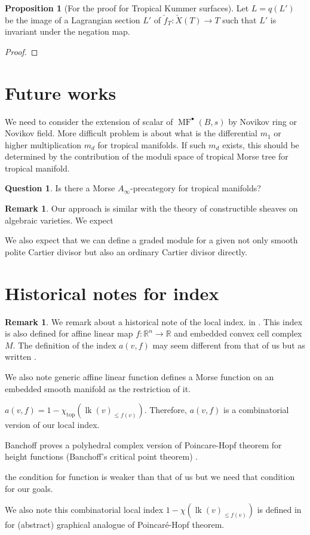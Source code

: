 \documentclass[a4paper,dvipdfmx,reqno,12pt]{amsart}
\theoremstyle{definition}
\newtheorem{Prop}[Thm]{Proposition}
\newtheorem{Ques}[Thm]{Question}
\newtheorem{Rmk}[Thm]{Remark}
\newcommand{\R}{\mathbb{R}}%
\newcommand{\opn}[1]{\operatorname{#1}}
\numberwithin{equation}{section}
\begin{document}
\begin{Prop}[{For the proof for Tropical Kummer surfaces}]
Let $L=q(L')$ be the image of a Lagrangian 
section $L'$ of $\check{f}_{T}\colon \check{X}(T)\to T$ such 
that $L'$ is invariant under the negation map. 
\end{Prop}
\begin{proof}

\end{proof}


\section{Future works}
We need to consider the extension of scalar of 
$\opn{MF}^{\bullet}(B,s)$ by 
Novikov ring or Novikov field.
More difficult problem is about what is the differential $m_1$ or higher multiplication $m_d$ for tropical manifolds.
If such $m_d$ exists, this should be determined by the contribution of the moduli space of tropical Morse tree for tropical manifold.
\begin{Ques}
  Is there a Morse $A_{\infty}$-precategory for tropical manifolds?
\end{Ques}

\begin{Rmk}
Our approach is similar with the theory of constructible sheaves 
on algebraic varieties.
We expect
\end{Rmk}

We also expect that we can define a graded module for a given
not only smooth polite Cartier divisor but also 
an ordinary Cartier divisor directly.



\appendix

\section{Historical notes for index}

\begin{Rmk}
  We remark about a historical note of the local index.
  in \cite[p.246]{MR225327}.
  This index is also defined for affine linear map $f:\R^{n}\to \R$ and embedded convex cell complex
  $M$.
  The definition of the index $a(v,f)$
  may seem different from that of us but as written .

  We also note generic affine linear function defines a Morse function
  on an embedded smooth manifold as the restriction of it.

  $a(v,f)=1-\chi_{\mathrm{top}}(\opn{lk}(v)_{\leq f(v)})$. Therefore, $a(v,f)$ is a combinatorial version of our local index.

  Banchoff proves a polyhedral complex version of Poincare-Hopf theorem
  for height functions (Banchoff's critical point theorem) \cite[Theorem 1]{MR225327}.

  the condition for function is weaker than that of us but we need that condition for our goals.

  We also note this combinatorial local index $1-\chi(\opn{lk}(v)_{\leq f(v)})$ is defined in
  \cite[3]{knill2012graph}
  for (abstract) graphical analogue of Poincar\'e-Hopf theorem.
\end{Rmk}
\end{document}
